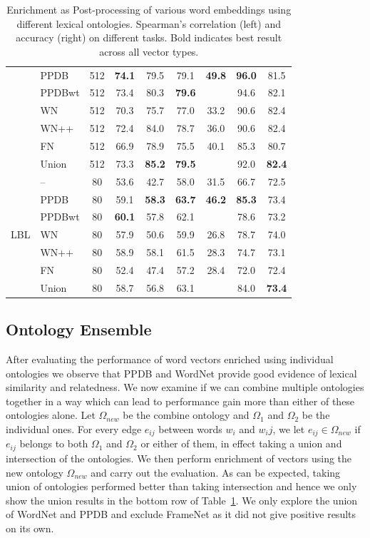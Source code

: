 \documentclass[11pt]{article}
\begin{document}
\begin{table}[!tbh]
\begin{tabular}{l|l|c||c|c|c||c|c||c}
& PPDB & 512 & \textbf{74.1} & 79.5 & 79.1 & \textbf{49.8} & \textbf{96.0} & 81.5\\
& PPDBwt & 512 & 73.4 & 80.3 & \textbf{79.6} & & 94.6 & 82.1\\
& WN & 512 & 70.3 & 75.7 & 77.0 & 33.2 & 90.6 & 82.4 \\
& WN++ & 512 & 72.4 & 84.0 & 78.7 & 36.0 & 90.6 & 82.4 \\
& FN & 512 & 66.9 & 78.9 & 75.5 & 40.1 & 85.3 & 80.7\\
& Union & 512 & 73.3 & \textbf{85.2} & \textbf{79.5} & & 92.0 & \textbf{82.4} \\
\hline\hline
\multirow{7}{*}{LBL} & -- & 80 & 53.6 & 42.7 & 58.0 & 31.5 & 66.7 & 72.5\\

& PPDB & 80 & 59.1 & \textbf{58.3} & \textbf{63.7} & \textbf{46.2} & \textbf{85.3} & 73.4\\
& PPDBwt & 80 & \textbf{60.1} & 57.8 & 62.1 & & 78.6 & 73.2\\
& WN & 80 & 57.9 & 50.6 & 59.9 & 26.8 & 78.7 & 74.0\\
& WN++ & 80 & 58.9 & 58.1 & 61.5 & 28.3 & 74.7 & 73.1 \\
& FN & 80 & 52.4 & 47.4 & 57.2 & 28.4 & 72.0 & 72.4\\
& Union & 80 & 58.7 & 56.8 & 63.1 & & 84.0 & \textbf{73.4}\\
\end{tabular}
   \caption{Enrichment as Post-processing of various word embeddings using different lexical 
   ontologies. Spearman's correlation (left) and accuracy (right) on different tasks. Bold indicates 
   best result across all vector types.}
  \label{tab:post-proc}
\end{table}

\subsection{Ontology Ensemble}

After evaluating the performance of word vectors enriched using individual 
ontologies we observe that PPDB and WordNet provide good evidence of lexical
similarity and relatedness. We now examine if we can combine multiple ontologies
together in a way which can lead to performance gain more than either of these ontologies alone.
Let $\Omega_{new}$ be the combine ontology and $\Omega_{1}$ and $\Omega_{2}$ be
the individual ones. For every edge $e_{ij}$ between words $w_i$ and $w_ij$, we let
$e_{ij} \in \Omega_{new}$ if $e_{ij}$ belongs to both $\Omega_{1}$ and $\Omega_{2}$
or either of them, in effect taking a union and intersection of the ontologies.
We then perform enrichment of vectors using the new ontology $\Omega_{new}$ 
and carry out the evaluation.
As can be expected, taking union of ontologies performed better than taking intersection and hence we only show the union results in the bottom row of Table~\ref{tab:post-proc}.
We only explore the union of WordNet and PPDB and exclude FrameNet as it did not give positive results on its own.
\end{document}
